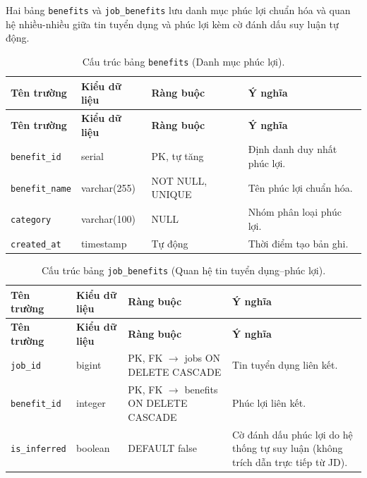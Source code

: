 Hai bảng \texttt{benefits} và \texttt{job\_\allowbreak benefits} lưu danh mục phúc lợi chuẩn hóa và quan hệ nhiều-nhiều giữa tin tuyển dụng và phúc lợi kèm cờ đánh dấu suy luận tự động.

\begin{footnotesize}\begin{longtable}{|L{3.5cm}|L{2.0cm}|L{3.0cm}|L{5.5cm}|}
\caption{Cấu trúc bảng \texttt{benefits} (Danh mục phúc lợi).}
\label{tab:benefits} \\
\hline
\textbf{Tên trường} & \textbf{Kiểu dữ liệu} & \textbf{Ràng buộc} & \textbf{Ý nghĩa} \\
\hline
\endfirsthead
\hline
\textbf{Tên trường} & \textbf{Kiểu dữ liệu} & \textbf{Ràng buộc} & \textbf{Ý nghĩa} \\
\hline
\endhead
\texttt{benefit\_id} & serial & PK, tự tăng & Định danh duy nhất phúc lợi. \\
\hline
\texttt{benefit\_name} & varchar(255) & NOT NULL, UNIQUE & Tên phúc lợi chuẩn hóa. \\
\hline
\texttt{category} & varchar(100) & NULL & Nhóm phân loại phúc lợi. \\
\hline
\texttt{created\_at} & timestamp & Tự động & Thời điểm tạo bản ghi. \\
\hline
\end{longtable}
\end{footnotesize}

\begin{footnotesize}\begin{longtable}{|L{3.5cm}|L{2.0cm}|L{3.0cm}|L{5.5cm}|}
\caption{Cấu trúc bảng \texttt{job\_\allowbreak benefits} (Quan hệ tin tuyển dụng--phúc lợi).}
\label{tab:job_benefits} \\
\hline
\textbf{Tên trường} & \textbf{Kiểu dữ liệu} & \textbf{Ràng buộc} & \textbf{Ý nghĩa} \\
\hline
\endfirsthead
\hline
\textbf{Tên trường} & \textbf{Kiểu dữ liệu} & \textbf{Ràng buộc} & \textbf{Ý nghĩa} \\
\hline
\endhead
\texttt{job\_id} & bigint & PK, FK $\rightarrow$ jobs ON DELETE CASCADE & Tin tuyển dụng liên kết. \\
\hline
\texttt{benefit\_id} & integer & PK, FK $\rightarrow$ benefits ON DELETE CASCADE & Phúc lợi liên kết. \\
\hline
\texttt{is\_inferred} & boolean & DEFAULT false & Cờ đánh dấu phúc lợi do hệ thống tự suy luận (không trích dẫn trực tiếp từ JD). \\
\hline
\end{longtable}
\end{footnotesize}

